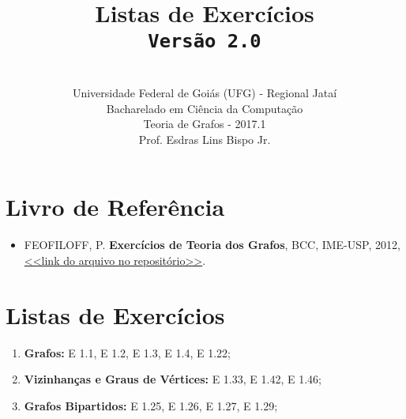 \documentclass[12pt,a4paper,oneside]{article}
\author{\\Universidade Federal de Goiás (UFG) - Regional Jataí\\Bacharelado em Ciência da Computação \\Teoria de Grafos - 2017.1 \\Prof. Esdras Lins Bispo Jr.}
\date{}
\title{
	\sc \huge Listas de Exercícios 
	\\{\tt Versão 2.0}
}
\begin{document}
\maketitle

\section{Livro de Referência}
	\begin{itemize}
		\item FEOFILOFF, P. {\bf Exercícios de Teoria dos Grafos}, BCC, IME-USP, 2012, \href{https://github.com/bispojr/grafos/raw/master/2017.1/arquivos/exercicios-grafos.pdf}{<<link do arquivo no repositório>>}.
	\end{itemize}
	
\section{Listas de Exercícios}

\begin{enumerate}

	\item[] {\bf Grafos:} E 1.1, E 1.2, E 1.3, E 1.4, E 1.22;
	\item[] {\bf Vizinhanças e Graus de Vértices:} E 1.33, E 1.42, E 1.46;
	\item[] {\bf Grafos Bipartidos:} E 1.25, E 1.26, E 1.27, E 1.29;

\end{enumerate}
\end{document}
